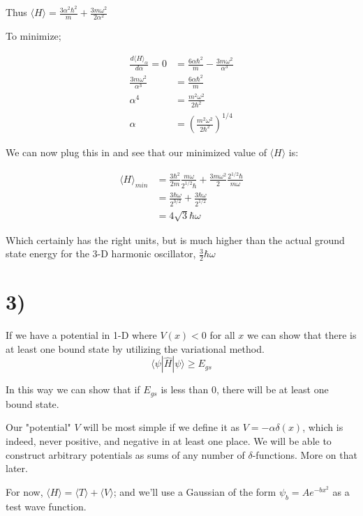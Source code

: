 \documentclass{article}
\newcommand{\p}[1]{\left(#1\right)}
\newcommand{\braket}[1]{\langle#1\rangle}
\begin{document}
Thus $\braket{H}=\frac{3\alpha^2\hbar^2}{m}+\frac{3m\omega^2}{2\alpha^2}$

To minimize;

\begin{align*}
    \frac{d\braket{H}_\alpha}{d\alpha}=0&=\frac{6\alpha\hbar^2}{m}-\frac{3m\omega^2}{\alpha^3}\\[1em]
    \frac{3m\omega^2}{\alpha^3}&=\frac{6\alpha\hbar^2}{m}\\[1em]
    \alpha^4&=\frac{m^2\omega^2}{2\hbar^2}\\[1em]
    \alpha&=\p{\frac{m^2\omega^2}{2\hbar^2}}^{1/4}
\end{align*}

We can now plug this in and see that our minimized value of $\braket{H}$ is:

\begin{align*}
    \braket{H}_{min}&=\frac{3\hbar^2}{2m}\frac{m\omega}{2^{1/2}\hbar}+\frac{3m\omega^2}{2}\frac{2^{1/2}\hbar}{m\omega}\\[1em]
    &=\frac{3\hbar\omega}{2^{3/2}}+\frac{3\hbar\omega}{2^{1/2}}\\[1em]
    &=4\sqrt{3}\hbar\omega
\end{align*}

Which certainly has the right units, but is much higher than the actual ground state energy for the 3-D harmonic oscillator, $\frac{3}{2}\hbar\omega$

\section*{3)}

If we have a potential in 1-D where $V(x)<0$ for all $x$ we can show that there is at least one bound state by utilizing the variational method. $$\langle\psi|\hat{H}|\psi\rangle\geq{E_{gs}}$$

In this way we can show that if $E_{gs}$ is less than $0$, there will be at least one bound state.

Our "potential" $V$ will be most simple if we define it as $V=-\alpha\delta(x)$, which is indeed, never positive, and negative in at least one place. We will be able to construct arbitrary potentials as sums of any number of $\delta$-functions. More on that later.

For now, $\braket{H}=\braket{T}+\braket{V}$; and we'll use a Gaussian of the form $\psi_b=Ae^{-bx^2}$ as a test wave function.
\end{document}
